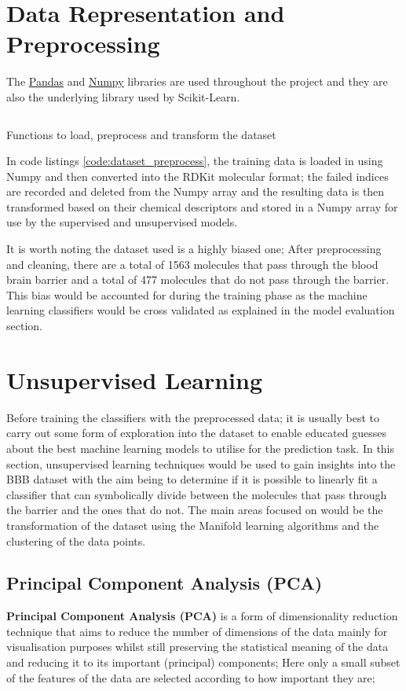 \documentclass[a4paper,12pt]{report}
\begin{document}
	\section{Data Representation and Preprocessing}
	The \href{http://pandas.pydata.org/}{Pandas} and \href{http://www.numpy.org/}{Numpy} libraries are used throughout the project and they are also the underlying library used by Scikit-Learn. 
		\begin{listing}[!htbp]
			\inputminted[breaklines=true,breakautoindent=true,linenos=true]{python}{source_code/dataset.py}
			\caption{Functions to load, preprocess and transform the dataset}
			\label{code:dataset_preprocess}
		\end{listing}
	In code listings \ref{code:dataset_preprocess}, the training data is loaded in using Numpy and then converted into the RDKit molecular format; the failed indices are recorded and deleted from the Numpy array and the resulting data is then transformed based on their chemical descriptors and stored in a Numpy array for use by the supervised and unsupervised models.
	
	It is worth noting the dataset used is a highly biased one; After preprocessing and cleaning, there are a total of 1563 molecules that pass through the blood brain barrier and a total of 477 molecules that do not pass through the barrier. This bias would be accounted for during the training phase as the machine learning classifiers would be cross validated as explained in the model evaluation section.
	
	
	
	
	
	\section{Unsupervised Learning}
	Before training the classifiers with the preprocessed data; it is usually best to carry out some form of exploration into the dataset to enable educated guesses about the best machine learning models to utilise for the prediction task. In this section, unsupervised learning techniques would be used to gain insights into the BBB dataset with the aim being to determine if it is possible to linearly fit a classifier that can symbolically divide between the molecules that pass through the barrier and the ones that do not. The main areas focused on would be the transformation of the dataset using the Manifold learning algorithms and the clustering of the data points.
	
		\subsection{Principal Component Analysis (PCA)}
		\textbf{Principal Component Analysis (PCA)} is a form of dimensionality reduction technique that aims to reduce the number of dimensions of the data mainly for visualisation purposes whilst still preserving the statistical meaning of the data and reducing it to its important (principal) components; Here only a small subset of the features of the data are selected according to how important they are; 
		
\end{document}
